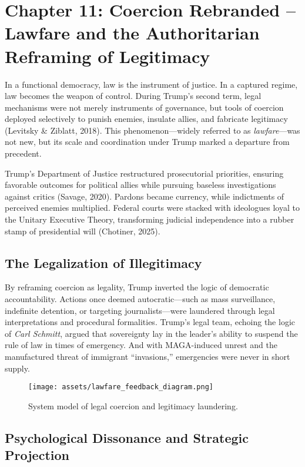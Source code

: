 \chapter{Chapter 11: Coercion Rebranded -- Lawfare and the Authoritarian Reframing of Legitimacy}

In a functional democracy, law is the instrument of justice. In a
captured regime, law becomes the weapon of control. During Trump's
second term, legal mechanisms were not merely instruments of governance,
but tools of coercion deployed selectively to punish enemies, insulate
allies, and fabricate legitimacy (Levitsky \& Ziblatt, 2018). This
phenomenon---widely referred to as \textit{lawfare}---was not new, but
its scale and coordination under Trump marked a departure from
precedent.

Trump's Department of Justice restructured prosecutorial priorities,
ensuring favorable outcomes for political allies while pursuing baseless
investigations against critics (Savage, 2020). Pardons became currency,
while indictments of perceived enemies multiplied. Federal courts were
stacked with ideologues loyal to the Unitary Executive Theory,
transforming judicial independence into a rubber stamp of presidential
will (Chotiner, 2025).

\section*{The Legalization of Illegitimacy}

By reframing coercion as legality, Trump inverted the logic of
democratic accountability. Actions once deemed autocratic---such as mass
surveillance, indefinite detention, or targeting journalists---were
laundered through legal interpretations and procedural formalities.
Trump's legal team, echoing the logic of \textit{Carl Schmitt}, argued
that sovereignty lay in the leader's ability to suspend the rule of law
in times of emergency. And with MAGA-induced unrest and the manufactured
threat of immigrant ``invasions,'' emergencies were never in short
supply.

\begin{figure}[H]
    \centering
    \texttt{[image: assets/lawfare\_feedback\_diagram.png]}
    \caption{System model of legal coercion and legitimacy laundering.}
    \label{fig:lawfare_model}
\end{figure}

\section*{Psychological Dissonance and Strategic Projection}


